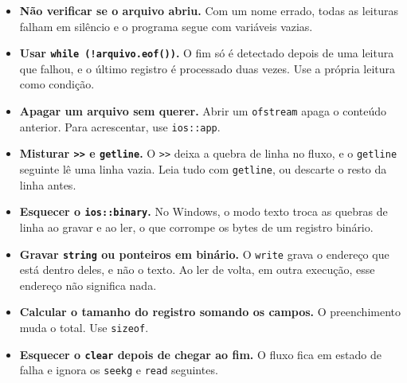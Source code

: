 \begin{itemize}
  \item \textbf{Não verificar se o arquivo abriu.} Com um nome errado, todas as leituras falham em silêncio e o programa segue com variáveis vazias.
  \item \textbf{Usar \texttt{while (!arquivo.eof())}.} O fim só é detectado depois de uma leitura que falhou, e o último registro é processado duas vezes. Use a própria leitura como condição.
  \item \textbf{Apagar um arquivo sem querer.} Abrir um \texttt{ofstream} apaga o conteúdo anterior. Para acrescentar, use \texttt{ios::app}.
  \item \textbf{Misturar \texttt{>>} e \texttt{getline}.} O \texttt{>>} deixa a quebra de linha no fluxo, e o \texttt{getline} seguinte lê uma linha vazia. Leia tudo com \texttt{getline}, ou descarte o resto da linha antes.
  \item \textbf{Esquecer o \texttt{ios::binary}.} No Windows, o modo texto troca as quebras de linha ao gravar e ao ler, o que corrompe os bytes de um registro binário.
  \item \textbf{Gravar \texttt{string} ou ponteiros em binário.} O \texttt{write} grava o endereço que está dentro deles, e não o texto. Ao ler de volta, em outra execução, esse endereço não significa nada.
  \item \textbf{Calcular o tamanho do registro somando os campos.} O preenchimento muda o total. Use \texttt{sizeof}.
  \item \textbf{Esquecer o \texttt{clear} depois de chegar ao fim.} O fluxo fica em estado de falha e ignora os \texttt{seekg} e \texttt{read} seguintes.
\end{itemize}
